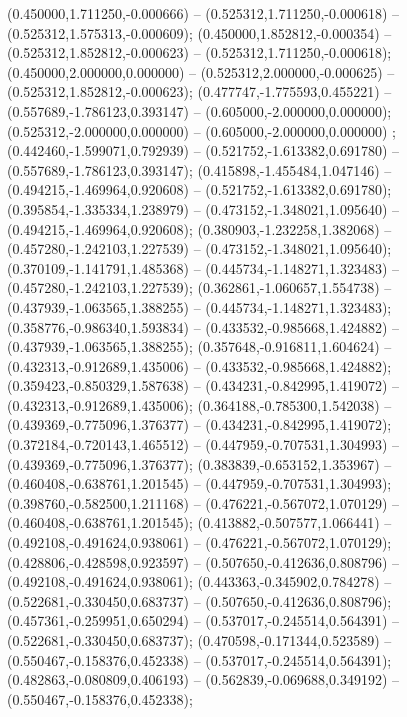  (0.450000,1.711250,-0.000666) -- (0.525312,1.711250,-0.000618) -- (0.525312,1.575313,-0.000609);
 (0.450000,1.852812,-0.000354) -- (0.525312,1.852812,-0.000623) -- (0.525312,1.711250,-0.000618);
 (0.450000,2.000000,0.000000) -- (0.525312,2.000000,-0.000625) -- (0.525312,1.852812,-0.000623);
 (0.477747,-1.775593,0.455221) -- (0.557689,-1.786123,0.393147) -- (0.605000,-2.000000,0.000000);
 (0.525312,-2.000000,0.000000) -- (0.605000,-2.000000,0.000000) ;
 (0.442460,-1.599071,0.792939) -- (0.521752,-1.613382,0.691780) -- (0.557689,-1.786123,0.393147);
 (0.415898,-1.455484,1.047146) -- (0.494215,-1.469964,0.920608) -- (0.521752,-1.613382,0.691780);
 (0.395854,-1.335334,1.238979) -- (0.473152,-1.348021,1.095640) -- (0.494215,-1.469964,0.920608);
 (0.380903,-1.232258,1.382068) -- (0.457280,-1.242103,1.227539) -- (0.473152,-1.348021,1.095640);
 (0.370109,-1.141791,1.485368) -- (0.445734,-1.148271,1.323483) -- (0.457280,-1.242103,1.227539);
 (0.362861,-1.060657,1.554738) -- (0.437939,-1.063565,1.388255) -- (0.445734,-1.148271,1.323483);
 (0.358776,-0.986340,1.593834) -- (0.433532,-0.985668,1.424882) -- (0.437939,-1.063565,1.388255);
 (0.357648,-0.916811,1.604624) -- (0.432313,-0.912689,1.435006) -- (0.433532,-0.985668,1.424882);
 (0.359423,-0.850329,1.587638) -- (0.434231,-0.842995,1.419072) -- (0.432313,-0.912689,1.435006);
 (0.364188,-0.785300,1.542038) -- (0.439369,-0.775096,1.376377) -- (0.434231,-0.842995,1.419072);
 (0.372184,-0.720143,1.465512) -- (0.447959,-0.707531,1.304993) -- (0.439369,-0.775096,1.376377);
 (0.383839,-0.653152,1.353967) -- (0.460408,-0.638761,1.201545) -- (0.447959,-0.707531,1.304993);
 (0.398760,-0.582500,1.211168) -- (0.476221,-0.567072,1.070129) -- (0.460408,-0.638761,1.201545);
 (0.413882,-0.507577,1.066441) -- (0.492108,-0.491624,0.938061) -- (0.476221,-0.567072,1.070129);
 (0.428806,-0.428598,0.923597) -- (0.507650,-0.412636,0.808796) -- (0.492108,-0.491624,0.938061);
 (0.443363,-0.345902,0.784278) -- (0.522681,-0.330450,0.683737) -- (0.507650,-0.412636,0.808796);
 (0.457361,-0.259951,0.650294) -- (0.537017,-0.245514,0.564391) -- (0.522681,-0.330450,0.683737);
 (0.470598,-0.171344,0.523589) -- (0.550467,-0.158376,0.452338) -- (0.537017,-0.245514,0.564391);
 (0.482863,-0.080809,0.406193) -- (0.562839,-0.069688,0.349192) -- (0.550467,-0.158376,0.452338);
